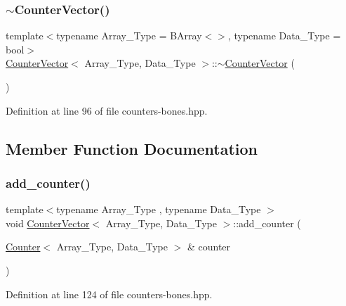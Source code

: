 \subsubsection{\texorpdfstring{$\sim$\+Counter\+Vector()}{~CounterVector()}}
{\footnotesize\ttfamily template$<$typename Array\+\_\+\+Type = B\+Array$<$$>$, typename Data\+\_\+\+Type = bool$>$ \\
\hyperlink{class_counter_vector}{Counter\+Vector}$<$ Array\+\_\+\+Type, Data\+\_\+\+Type $>$\+::$\sim$\hyperlink{class_counter_vector}{Counter\+Vector} (\begin{DoxyParamCaption}{ }\end{DoxyParamCaption})\hspace{0.3cm}{\ttfamily [inline]}}



Definition at line 96 of file counters-\/bones.\+hpp.



\subsection{Member Function Documentation}
\mbox{\label{class_counter_vector_a34fda06ff678691daf3b0455c1a2af48}} 
\subsubsection{\texorpdfstring{add\+\_\+counter()}{add\_counter()}\hspace{0.1cm}{\footnotesize\ttfamily [1/3]}}
{\footnotesize\ttfamily template$<$typename Array\+\_\+\+Type , typename Data\+\_\+\+Type $>$ \\
void \hyperlink{class_counter_vector}{Counter\+Vector}$<$ Array\+\_\+\+Type, Data\+\_\+\+Type $>$\+::add\+\_\+counter (\begin{DoxyParamCaption}\item[{\hyperlink{class_counter}{Counter}$<$ Array\+\_\+\+Type, Data\+\_\+\+Type $>$ \&}]{counter }\end{DoxyParamCaption})\hspace{0.3cm}{\ttfamily [inline]}}



Definition at line 124 of file counters-\/bones.\+hpp.

\mbox{\label{class_counter_vector_a062d52e18f1d3ba4c00cbf4c2d89f1e7}} 
